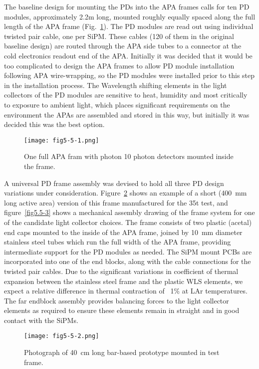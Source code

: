 The baseline design for mounting the PDs into the APA frames calls for
ten PD modules, approximately 2.2m long, mounted roughly equally
spaced along the full length of the APA frame (Fig.~\ref{fig5.5-1}).  The
PD modules are read out using individual twisted pair cable, one per
SiPM.  These cables (120 of them in the original baseline design) are
routed through the APA side tubes to a connector at the cold
electronics readout end of the APA.  Initially it was decided that it
would be too complicated to design the APA frames to allow PD module
installation following APA wire-wrapping, so the PD modules were
installed prior to this step in the installation process.  The
Wavelength shifting elements in the light collectors of the PD modules
are sensitive to heat, humidity and most critically to exposure to
ambient light, which places significant requirements on the
environment the APAs are assembled and stored in this way, but
initially it was decided this was the best option.

\begin{figure}[h!]
  \centering
  \texttt{[image: fig5-5-1.png]}
\caption{One full APA fram with photon 10 photon detectors mounted
  inside the frame.}
\label{fig5.5-1}
\end{figure}

A universal PD frame assembly was devised to hold all three PD design
variations under consideration.  Figure~\ref{fig5.5-2} shows an example of a
short (400~mm long active area) version of this frame manufactured for
the 35t test, and figure~\ref{fig5.5-3} shows a mechanical assembly drawing of
the frame system for one of the candidate light collector choices.
The frame consists of two plastic (acetal) end caps mounted to the
inside of the APA frame, joined by 10~mm diameter stainless steel tubes
which run the full width of the APA frame, providing intermediate
support for the PD modules as needed.  The SiPM mount PCBs are
incorporated into one of the end blocks, along with the cable
connections for the twisted pair cables.  Due to the significant
variations in coefficient of thermal expansion between the stainless
steel frame and the plastic WLS elements, we expect a relative
difference in thermal contraction of ~1\% at LAr temperatures.  The
far endblock assembly provides balancing forces to the light collector
elements as required to ensure these elements remain in straight and
in good contact with the SiPMs.

\begin{figure}[h!]
  \centering
  \texttt{[image: fig5-5-2.png]}
\caption{Photograph of 40~cm long bar-based prototype mounted in test frame.}
\label{fig5.5-2}
\end{figure}

